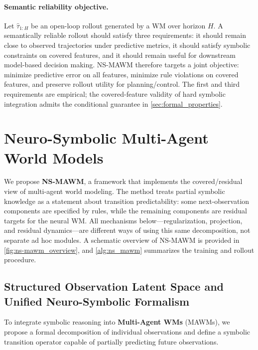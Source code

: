 \documentclass{article}
\theoremstyle{plain}
\theoremstyle{definition}
\theoremstyle{remark}
\begin{document}
\paragraph{Semantic reliability objective.}
Let $\hat{\tau}_{1:H}$ be an open-loop rollout generated by a WM over horizon $H$. A semantically reliable rollout should satisfy three requirements: it should remain close to observed trajectories under predictive metrics, it should satisfy symbolic constraints on covered features, and it should remain useful for downstream model-based decision making. NS-MAWM therefore targets a joint objective: minimize predictive error on all features, minimize rule violations on covered features, and preserve rollout utility for planning/control. The first and third requirements are empirical; the covered-feature validity of hard symbolic integration admits the conditional guarantee in \autoref{sec:formal_properties}.


\section{Neuro-Symbolic Multi-Agent World Models}
\label{sec:method}

We propose \textbf{NS-MAWM}, a framework that implements the covered/residual view of multi-agent world modeling. The method treats partial symbolic knowledge as a statement about transition predictability: some next-observation components are specified by rules, while the remaining components are residual targets for the neural WM. All mechanisms below---regularization, projection, and residual dynamics---are different ways of using this same decomposition, not separate ad hoc modules. A schematic overview of NS-MAWM is provided in \autoref{fig:ns-mawm_overview}, and \autoref{alg:ns_mawm} summarizes the training and rollout procedure.

\subsection{Structured Observation Latent Space and Unified Neuro-Symbolic Formalism}
\label{sec:ns}

To integrate symbolic reasoning into \textbf{Multi-Agent WMs} (MAWMs), we propose a formal decomposition of individual observations and define a symbolic transition operator capable of partially predicting future observations.
\end{document}
